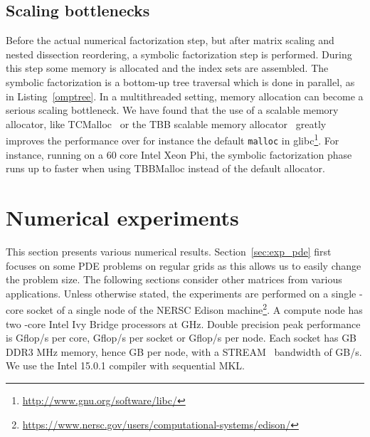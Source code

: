 \documentclass{article}
\newcommand{\tm}{\textsuperscript{\textregistered}}
\begin{document}
\subsection{Scaling bottlenecks}
Before the actual numerical factorization step, but after matrix
scaling and nested dissection reordering, a symbolic factorization
step is performed. During this step some memory is allocated and the
index sets  are assembled.
The symbolic factorization is a bottom-up tree traversal which is done
in parallel, as in Listing~\ref{omptree}.
In a multithreaded setting, memory allocation can become a serious
scaling bottleneck. We have found that the use of a scalable memory
allocator, like TCMalloc~\cite{ghemawat2009tcmalloc} or the TBB
scalable memory allocator~\cite{reinders2007intel} greatly improves
the performance over for instance the default \verb+malloc+ in
glibc\footnote{\url{http://www.gnu.org/software/libc/}}. For instance,
running on a 60 core Intel\tm{} Xeon Phi, the symbolic factorization
phase runs up to  faster when using TBBMalloc instead of
the default allocator.




\section{Numerical experiments}\label{sec:experiments}
This section presents various numerical
results. Section~\ref{sec:exp_pde} first focuses on some PDE problems
on regular grids as this allows us to easily change the problem
size. The following sections consider other matrices from various
applications.  Unless otherwise stated, the experiments are performed
on a single -core socket of a single node of the NERSC Edison
machine\footnote{\url{https://www.nersc.gov/users/computational-systems/edison/}}. A
compute node has two -core Intel\tm{} Ivy Bridge processors at
GHz. Double precision peak performance is Gflop/s per core,
Gflop/s per socket or Gflop/s per node. Each socket has
GB DDR3 MHz memory, hence GB per node, with a
STREAM~\cite{streambench} bandwidth of GB/s. We use the
Intel\tm{} 15.0.1 compiler with sequential MKL.
\end{document}
